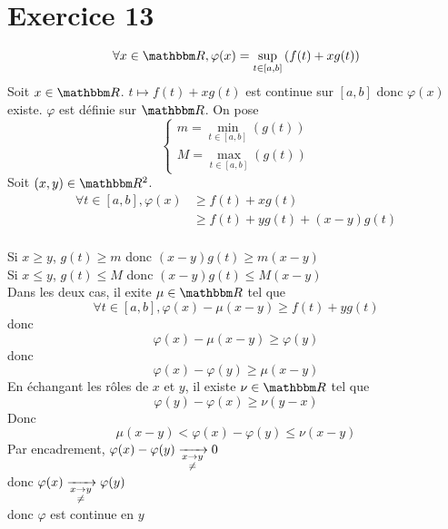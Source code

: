 \part{Exercice 13}

\[
	\forall x \in \R,
	\varphi(x) = \sup_{t \in [a,b]} \left( f(t) + xg(t) \right) 
\]
Soit $x \in \R$. $t \mapsto f(t) + xg(t)$ est continue sur $[a,b]$ donc $\varphi(x)$ existe.  $\varphi$ est définie sur $\R$.
On pose \[
	\begin{cases}
		m = \min_{t \in [a,b]}(g(t))\\
		M = \max_{t \in [a,b]}(g(t))
	\end{cases}
\] 
Soit $(x,y) \in \R^2$.
\begin{align*}
	\forall t \in [a,b],
	\varphi(x) &\ge f(t) + xg(t)\\
						 &\ge f(t) + yg(t) + (x-y)g(t)\\
\end{align*}

Si $x \ge y$, $g(t) \ge m$ donc $(x-y)g(t) \ge m(x-y)$ \\
Si $x \le y$, $g(t) \le M$ donc $(x-y)g(t) \le M(x-y)$ \\

Dans les deux cas, il exite $\mu\in \R$ tel que \[
	\forall t \in [a,b], \varphi(x) - \mu(x-y) \ge f(t) + yg(t)
\] donc \[
	\varphi(x) - \mu(x-y) \ge \varphi(y)
\] donc \[
	\varphi(x) - \varphi(y) \ge \mu(x-y)
\] En échangant les rôles de $x$ et $y$, il existe $\nu\in \R$ tel que \[
	\varphi(y) - \varphi(x) \ge \nu(y-x)
\] Donc \[
	\mu(x-y) < \varphi(x) - \varphi(y) \le \nu(x-y)
\] Par encadrement, $\varphi(x) - \varphi(y) \xrightarrow[\substack{x\to y\\\neq}]{} 0$\\
donc $\varphi(x) \xrightarrow[\substack{x\to y\\\neq}]{} \varphi(y)$\\
donc $\varphi$ est continue en $y$
